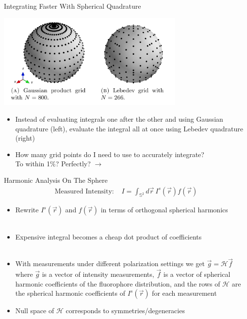 \documentclass[presentation]{beamer}
\begin{document}
\begin{frame}[label=sec-3]{Integrating Faster With Spherical Quadrature}
\begin{center}
  \includegraphics[width=0.7\textwidth, interpolate=true]{figs/quadrature.png}
\end{center}
\begin{itemize}
\item Instead of evaluating integrals one after the other and using Gaussian quadrature (left), evaluate the integral all at once using Lebedev quadrature (right)
\item How many grid points do I need to use to accurately integrate?\\ To within 1\%? Perfectly? $\rightarrow$
\end{itemize}
\end{frame}
\begin{frame}[label=sec-4]{Harmonic Analysis On The Sphere}
\begin{align*}
  \text{Measured Intensity:   }& I = \int_{\mathbb{S}^2}d\vec{r}\ I^s(\vec{r})f(\vec{r})
\end{align*}
\begin{itemize}
\item Rewrite $I^s(\vec{r})$ and $f(\vec{r})$ in terms of orthogonal spherical harmonics\\ \\
\item Expensive integral becomes a cheap dot product of coefficients\\ \\
\item With measurements under different polarization settings we get $\vec{g} = \mathcal{H}\vec{f}$ where $\vec{g}$ is a vector of intensity measurements, $\vec{f}$ is a vector of spherical harmonic coefficients of the fluorophore distribution, and the rows of $\mathcal{H}$ are the spherical harmonic coefficients of $I^s(\vec{r})$ for each measurement \\ 
\item Null space of $\mathcal{H}$ corresponds to symmetries/degeneracies
\end{itemize}
\end{frame}
\end{document}

